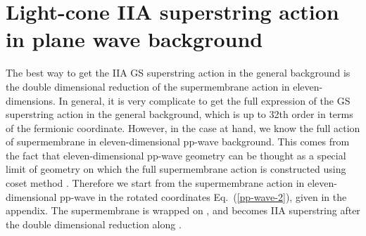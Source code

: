 \documentclass[a4paper,12pt]{article}
\begin{document}
\section{Light-cone IIA superstring action in plane wave background}

The best way to get the IIA GS superstring action in the general
background is the double dimensional reduction of the supermembrane
action in eleven-dimensions\cite{duf70}.  In general, it is very
complicate to get the full expression of the GS superstring action in
the general background, which is up to 32th order in terms of the
fermionic coordinate. However, in the case at hand, we know the full
action of supermembrane in eleven-dimensional pp-wave background. This
comes from the fact that eleven-dimensional pp-wave geometry can be
thought as a special limit \cite{pen271,bla081} of \coordHE{}
geometry on which the full supermembrane action is constructed using
coset method \cite{dew209}. Therefore we start from the supermembrane
action in eleven-dimensional pp-wave in the rotated coordinates
Eq.~(\ref{pp-wave-2}), given in the appendix. The supermembrane is
wrapped on \coordHE{}, and becomes IIA superstring after the double
dimensional reduction along \coordHE{}.
\end{document}
